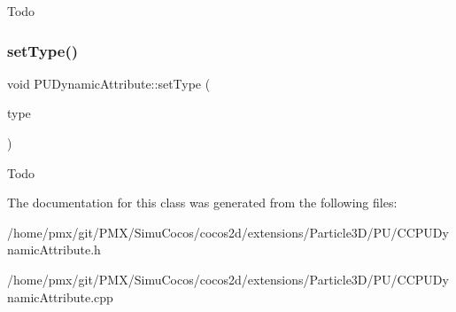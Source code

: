 Todo \mbox{\label{classPUDynamicAttribute_ae8f339de34c30da332fb56648f862594}} 
\subsubsection{\texorpdfstring{set\+Type()}{setType()}\hspace{0.1cm}{\footnotesize\ttfamily [2/2]}}
{\footnotesize\ttfamily void P\+U\+Dynamic\+Attribute\+::set\+Type (\begin{DoxyParamCaption}\item[{Dynamic\+Attribute\+Type}]{type }\end{DoxyParamCaption})}

Todo 

The documentation for this class was generated from the following files\+:\begin{DoxyCompactItemize}
\item 
/home/pmx/git/\+P\+M\+X/\+Simu\+Cocos/cocos2d/extensions/\+Particle3\+D/\+P\+U/C\+C\+P\+U\+Dynamic\+Attribute.\+h\item 
/home/pmx/git/\+P\+M\+X/\+Simu\+Cocos/cocos2d/extensions/\+Particle3\+D/\+P\+U/C\+C\+P\+U\+Dynamic\+Attribute.\+cpp\end{DoxyCompactItemize}

